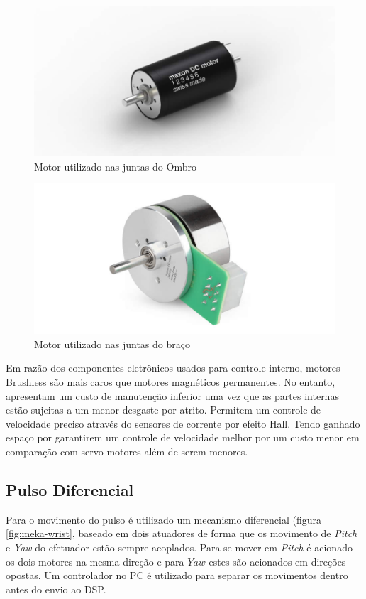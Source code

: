 \begin{figure}[H]
    \centering
    \includegraphics[width = 0.5\linewidth]{figs/maxon_servo.jpg}
    \caption{Motor utilizado nas juntas do Ombro}
    \label{fig:maxon-servo}
\end{figure}

\begin{figure}[H]
    \centering
    \includegraphics[width = 0.5\linewidth]{figs/maxon_flat_servo.jpg}
    \caption{Motor utilizado nas juntas do braço}
    \label{fig:maxon-flat-servo}
\end{figure}

Em razão dos componentes eletrônicos usados para controle interno, motores Brushless são mais caros que motores magnéticos permanentes. No entanto, apresentam um custo de manutenção inferior uma vez que as partes internas estão sujeitas a um menor desgaste por atrito. Permitem um controle de velocidade preciso através do sensores de corrente por efeito Hall. Tendo ganhado espaço por garantirem um controle de velocidade melhor por um custo menor em comparação com servo-motores além de serem menores.


\subsection{Pulso Diferencial}

Para o movimento do pulso é utilizado um mecanismo diferencial (figura \ref{fig:meka-wrist}, baseado em dois atuadores de forma que os movimento de \textit{Pitch} e \textit{Yaw} do efetuador estão sempre acoplados. Para se mover em \textit{Pitch} é acionado os dois motores na mesma direção e para $Yaw$ estes são acionados em direções opostas. Um controlador no PC é utilizado para separar os movimentos dentro antes do envio ao DSP.

